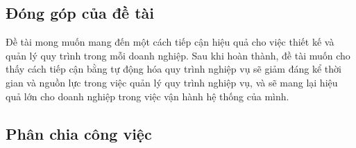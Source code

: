 \subsection{Đóng góp của đề tài}
\hspace{0.5cm} Đề tài mong muốn mang đến một cách tiếp cận hiệu quả cho việc thiết kế và quản lý quy trình trong mỗi doanh nghiệp. Sau khi hoàn thành, đề tài muốn cho thấy cách tiếp cận bằng tự động hóa quy trình nghiệp vụ sẽ giảm đáng kể thời gian và nguồn lực trong việc quản lý quy trình nghiệp vụ, và sẽ mang lại hiệu quả lớn cho doanh nghiệp trong việc vận hành hệ thống của mình.

\subsection{Phân chia công việc}
